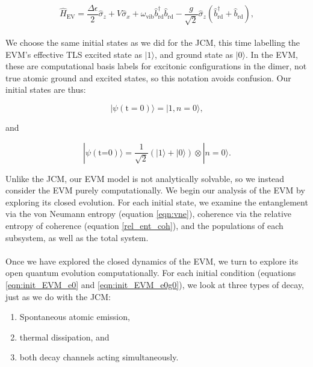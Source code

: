 \documentclass[11pt]{article}
\begin{document}
\begin{equation*}
    \hat{H}_{\scriptscriptstyle \text{EV}} = \frac{\Delta\epsilon}{2}\hat{\sigma}_z + V\hat{\sigma}_x + \omega_{\scriptscriptstyle \text{vib}} \hat{b}_{\scriptscriptstyle \text{rd}}^\dagger \hat{b}_{\scriptscriptstyle \text{rd}} -\frac{g}{\sqrt{2}}\hat{\sigma}_z\left(\hat{b}_{\scriptscriptstyle \text{rd}}^\dagger + \hat{b}_{\scriptscriptstyle \text{rd}}\right),
\end{equation*}
\\
We choose the same initial states as we did for the JCM, this time labelling the EVM's effective TLS excited state as $|1\rangle$, and ground state as $|0\rangle$. In the EVM, these are computational basis labels for excitonic configurations in the dimer, not true atomic ground and excited states, so this notation avoids confusion. Our initial states are thus:

\begin{equation} \label{eqn:init_EVM_e0}
    |\psi (\text{t}=0)\rangle = |1,n=0\rangle,
\end{equation}

and 

\begin{equation}\label{eqn:init_EVM_e0g0}
    |\psi (\text{t=0})\rangle = \frac{1}{\sqrt{2}}(|1\rangle + |0\rangle)\otimes|n=0\rangle.
\end{equation}

Unlike the JCM, our EVM model is not analytically solvable, so we instead consider the EVM purely computationally. We begin our analysis of the EVM by exploring its closed evolution. For each initial state, we examine the entanglement via the von Neumann entropy (equation \eqref{eqn:vne}), coherence via the relative entropy of coherence (equation \eqref{rel_ent_coh}), and the populations of each subsystem, as well as the total system.\\
\\
Once we have explored the closed dynamics of the EVM, we turn to explore its open quantum evolution computationally. For each initial condition (equations \eqref{eqn:init_EVM_e0} and \eqref{eqn:init_EVM_e0g0}), we look at three types of decay, just as we do with the JCM:

\begin{enumerate}
    \item Spontaneous atomic emission, 
    \item thermal dissipation, and
    \item both decay channels acting simultaneously.
\end{enumerate}
\end{document}
